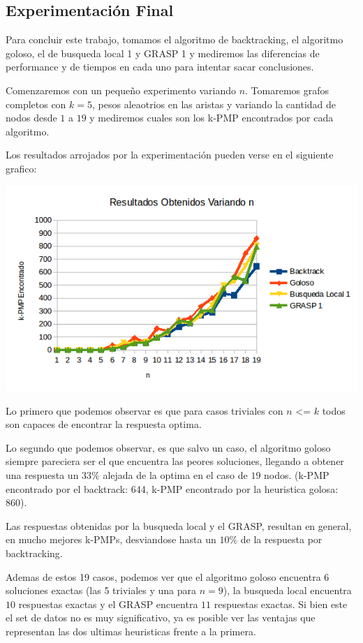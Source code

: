 \subsection{Experimentación Final}

Para concluir este trabajo, tomamos el algoritmo de backtracking, el algoritmo goloso, el de busqueda local 1 y GRASP 1 y mediremos las diferencias de performance y de tiempos en cada uno para intentar sacar conclusiones.

Comenzaremos con un pequeño experimento variando $n$. Tomaremos grafos completos con $k = 5$, pesos aleaotrios en las aristas y variando la cantidad de nodos desde $1$ a $19$ y mediremos cuales son los k-PMP encontrados por cada algoritmo.

Los resultados arrojados por la experimentación pueden verse en el siguiente grafico:

\includegraphics[scale=0.5]{Con/performance1.png}

Lo primero que podemos observar es que para casos triviales con $n$ <= $k$ todos son capaces de encontrar la respuesta optima.

Lo segundo que podemos observar, es que salvo un caso, el algoritmo goloso siempre pareciera ser el que encuentra las peores soluciones, llegando a obtener una respuesta un $33 \%$ alejada de la optima en el caso de $19$ nodos. (k-PMP encontrado por el backtrack: 644, k-PMP encontrado por la heuristica golosa: 860).

Las respuestas obtenidas por la busqueda local y el GRASP, resultan en general, en mucho mejores k-PMPs, desviandose hasta un $10\%$ de la respuesta por backtracking.

Ademas de estos 19 casos, podemos ver que el algoritmo goloso encuentra $6$ soluciones exactas (las 5 triviales y una para $n = 9$), la busqueda local encuentra $10$ respuestas exactas y el GRASP encuentra $11$ respuestas exactas. Si bien este el set de datos no es muy significativo, ya es posible ver las ventajas que representan las dos ultimas heuristicas frente a la primera.

